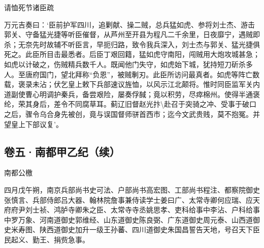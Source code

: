\documentclass[]{article}
\begin{document}
请恤死节诸臣疏

万元吉奏曰：`臣前护军四川，追剿献、操二贼，总兵猛如虎、参将刘士杰、游击郭关、守备猛光捷等听臣催督，从芦州至开县为程凡二千余里，日夜靡宁，遇贼即杀；无奈先时故辅不听臣言，早扼归路，致令我兵深入，刘士杰与郭关、猛光捷俱死之。此臣所目击最悉者。后臣丁艰回籍，猛如虎守南阳，闯贼用大炮攻城甚急；如虎以计破之，伤贼精兵数千人。既闻他门失守，如虎始下城，犹持短刀斫杀多人。至唐府国门，望北拜称``负恩''，被贼剸刃。此臣所访问最真者。如虎等阵亡数载，褒录未沾；伏乞皇上敕下兵部速议旌恤，以风示江北颠将。惟时同臣监军关内道副使曹心明调护秦兵，备尝艰险，屡奏俘馘；竟以积劳，尽瘁棉州。使得半通褒纶，荣其身后，差令不同腐草耳。蓟辽旧督赵光抃\textbackslash{}赴召于突骑之冲、受事于破口之后，骤令乌合身先被创，竟与误国督师骈首西市；迄今文武贵贱，莫不抱冤。并望皇上下部议复'。

\hypertarget{header-n37}{%
\subsection{卷五·南都甲乙纪（续）}\label{header-n37}}

南都公檄

四月戊午朔，南京兵部尚书史可法、户部尚书高宏图、工部尚书程注、都察院御史张慎言、兵部侍郎吕大器、翰林院詹事兼侍读学士姜曰广、太常寺卿何应瑞、应天府府尹刘士祯、鸿胪寺卿朱之臣、太常寺寺丞姚思孝、吏科给事中李沾、户科给事中罗万象、河南道御史郭维经、山东道御史陈良弼、广东道御史周元泰、山西道御史米寿图、陕西道御史加升一级王孙蕃、四川道御史朱国昌誓告天地，号召天下臣民起义、勤王、捐赀急事。
\end{document}
